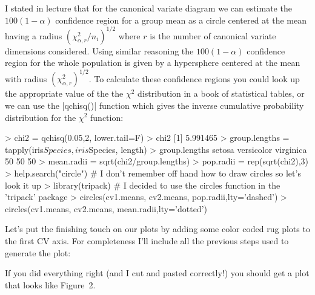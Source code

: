 I stated in lecture that for the canonical variate diagram we can estimate the $100(1-\alpha)$ confidence region for a group mean as a circle centered at the mean having a radius $(\chi^{2}_{\alpha,r}/n_i)^{1/2}$ where $r$ is the number of canonical variate dimensions considered. Using similar reasoning the $100(1-\alpha)$ confidence region for the whole population is given by a hypersphere centered at the mean with radius $(\chi^{2}_{\alpha,r})^{1/2}$.  
To calculate these confidence regions you could look up the appropriate value of the the  $\chi^2$ distribution in a book of statistical tables, or we can use the |qchisq()| function which gives the inverse cumulative probability distribution for the $\chi^2$ function:

\begin{Code}
> chi2 = qchisq(0.05,2, lower.tail=F)
> chi2
[1] 5.991465
> group.lengths = tapply(iris$Species, iris$Species, length)
> group.lengths
    setosa versicolor  virginica 
        50         50         50 
> mean.radii = sqrt(chi2/group.lengths)
> pop.radii = rep(sqrt(chi2),3)
> help.search("circle")  # I don't remember off hand how to draw circles so let's look it up
> library(tripack) # I decided to use the circles function in the 'tripack' package
> circles(cv1.means, cv2.means, pop.radii,lty='dashed') 
> circles(cv1.means, cv2.means, mean.radii,lty='dotted')
\end{Code}

Let's put the finishing touch on our plots by adding some color coded rug plots to the first CV axis. For completeness I'll include all the previous steps used to generate the plot:



If you did everything right (and I cut and pasted correctly!) you should get a plot that looks like Figure~2.

